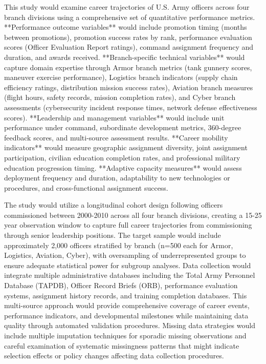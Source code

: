 \documentclass[main.tex]{subfiles}
\begin{document}

This study would examine career trajectories of U.S. Army officers across four branch divisions using a comprehensive set of quantitative performance metrics. **Performance outcome variables** would include promotion timing (months between promotions), promotion success rates by rank, performance evaluation scores (Officer Evaluation Report ratings), command assignment frequency and duration, and awards received. **Branch-specific technical variables** would capture domain expertise through Armor branch metrics (tank gunnery scores, maneuver exercise performance), Logistics branch indicators (supply chain efficiency ratings, distribution mission success rates), Aviation branch measures (flight hours, safety records, mission completion rates), and Cyber branch assessments (cybersecurity incident response times, network defense effectiveness scores). **Leadership and management variables** would include unit performance under command, subordinate development metrics, 360-degree feedback scores, and multi-source assessment results. **Career mobility indicators** would measure geographic assignment diversity, joint assignment participation, civilian education completion rates, and professional military education progression timing. **Adaptive capacity measures** would assess deployment frequency and duration, adaptability to new technologies or procedures, and cross-functional assignment success.


The study would utilize a longitudinal cohort design following officers commissioned between 2000-2010 across all four branch divisions, creating a 15-25 year observation window to capture full career trajectories from commissioning through senior leadership positions. The target sample would include approximately 2,000 officers stratified by branch (n=500 each for Armor, Logistics, Aviation, Cyber), with oversampling of underrepresented groups to ensure adequate statistical power for subgroup analyses. Data collection would integrate multiple administrative databases including the Total Army Personnel Database (TAPDB), Officer Record Briefs (ORB), performance evaluation systems, assignment history records, and training completion databases. This multi-source approach would provide comprehensive coverage of career events, performance indicators, and developmental milestones while maintaining data quality through automated validation procedures. Missing data strategies would include multiple imputation techniques for sporadic missing observations and careful examination of systematic missingness patterns that might indicate selection effects or policy changes affecting data collection procedures.
\end{document}
